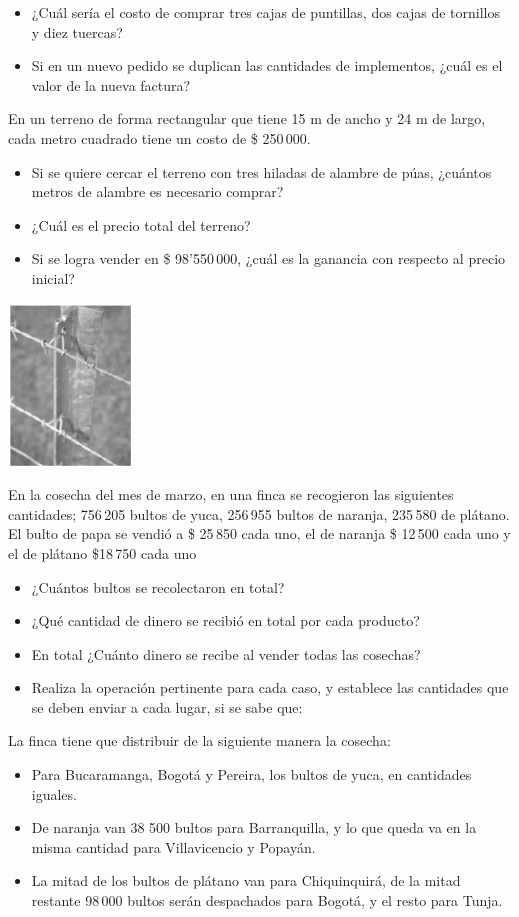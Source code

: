 \documentclass[letterpaper,11pt,twoside]{article}
\begin{document}
\begin{itemize}
\item ¿Cuál sería el costo de comprar tres cajas de puntillas, dos cajas de tornillos y
diez tuercas?
\item Si en un nuevo pedido se duplican las cantidades de implementos, ¿cuál es el valor de la nueva factura?
\end{itemize}
\begin{minipage}{.65\textwidth}
En un terreno de forma rectangular que tiene 15 m de ancho y 24 m de largo, cada metro cuadrado tiene un costo de \$ 250\,000.
\begin{itemize}
\item  Si se quiere cercar el terreno con tres hiladas de alambre de púas, ¿cuántos metros de alambre es necesario comprar?
\item  ¿Cuál es el precio total del terreno?
\item  Si se logra vender en \$ 98'550\,000, ¿cuál es la ganancia con respecto al precio inicial?	
\end{itemize}
\end{minipage}\hfill
\begin{minipage}{.35\textwidth}
\includegraphics[scale=1]{Images/terreno_a.png} 
\end{minipage}
En la cosecha del mes de marzo, en una finca se recogieron las siguientes cantidades; 756\,205 bultos de yuca, 256\,955 bultos de naranja, 235\,580 de plátano. El bulto de papa se vendió a \$ 25\,850 cada uno, el de naranja \$ 12\,500
cada uno y el de plátano \$18\,750 cada uno
\begin{itemize}
\item ¿Cuántos bultos se recolectaron en total?
\item ¿Qué cantidad de dinero se recibió en total por cada producto?
\item En total ¿Cuánto dinero se recibe al vender todas las cosechas?
\item Realiza la operación pertinente para cada caso, y establece las cantidades que se
deben enviar a cada lugar, si se sabe que:
\end{itemize}
La finca tiene que distribuir de la siguiente manera la cosecha:
\begin{itemize}
\item Para Bucaramanga, Bogotá y Pereira, los bultos de yuca, en cantidades iguales.
\item De naranja van 38 500 bultos para Barranquilla, y lo que queda va en la misma cantidad para Villavicencio y Popayán.
\item La mitad de los bultos de plátano van para Chiquinquirá, de la mitad restante 98\,000 bultos serán despachados para Bogotá, y el resto para Tunja.
\end{itemize}
\end{document}
